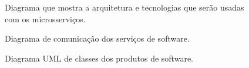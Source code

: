 \begin{figure}[!h]
	\caption{\label{fig:diagrama-arq-microsservicos} Diagrama que mostra a arquitetura e tecnologias que serão usadas com os microsserviços.}
\end{figure}

\begin{figure}[ht]
	\caption{\label{fig:diagrama-comm-soft} Diagrama de comunicação dos serviços de software.}
\end{figure}

\begin{figure}[ht]
	\caption{\label{fig:diagrama-classe-soft} Diagrama UML de classes dos produtos de software.}
\end{figure}
